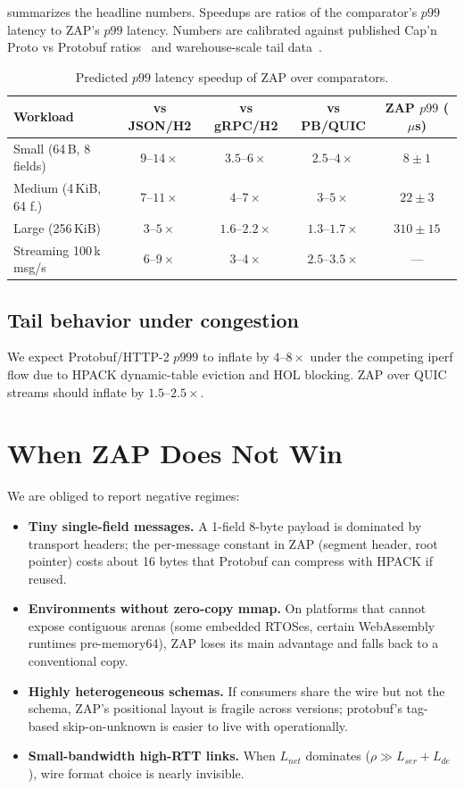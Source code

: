 \documentclass[11pt]{article}
\theoremstyle{definition}
\theoremstyle{remark}
\begin{document}
 summarizes the headline numbers. Speedups are
ratios of the comparator's $p99$ latency to ZAP's $p99$ latency.
Numbers are calibrated against published Cap'n Proto vs Protobuf
ratios~\cite{capnproto-bench} and warehouse-scale tail
data~\cite{xu2024microsecond}.

\begin{table}[h]
\centering
\caption{Predicted $p99$ latency speedup of ZAP over comparators.}
\label{tab:predicted}
\begin{tabular}{lcccc}
\toprule
Workload & vs JSON/H2 & vs gRPC/H2 & vs PB/QUIC & ZAP $p99$ ($\mu$s) \\
\midrule
Small (64\,B, 8 fields)  & $9$--$14\times$ & $3.5$--$6\times$ & $2.5$--$4\times$ & $8\pm1$ \\
Medium (4\,KiB, 64 f.)   & $7$--$11\times$ & $4$--$7\times$   & $3$--$5\times$   & $22\pm3$ \\
Large (256\,KiB)         & $3$--$5\times$  & $1.6$--$2.2\times$ & $1.3$--$1.7\times$ & $310\pm15$ \\
Streaming 100\,k msg/s   & $6$--$9\times$  & $3$--$4\times$   & $2.5$--$3.5\times$ & --- \\
\bottomrule
\end{tabular}
\end{table}

\subsection{Tail behavior under congestion}
We expect Protobuf/HTTP-2 $p999$ to inflate by $4$--$8\times$ under the
competing iperf flow due to HPACK dynamic-table eviction and
HOL blocking. ZAP over QUIC streams should inflate by $1.5$--$2.5\times$.

\section{When ZAP Does Not Win}
\label{sec:caveats}

We are obliged to report negative regimes:
\begin{itemize}
  \item \textbf{Tiny single-field messages.} A 1-field 8-byte payload
        is dominated by transport headers; the per-message constant in
        ZAP (segment header, root pointer) costs about 16 bytes that
        Protobuf can compress with HPACK if reused.
  \item \textbf{Environments without zero-copy mmap.} On platforms that
        cannot expose contiguous arenas (some embedded RTOSes, certain
        WebAssembly runtimes pre-memory64), ZAP loses its main
        advantage and falls back to a conventional copy.
  \item \textbf{Highly heterogeneous schemas.} If consumers share the
        wire but not the schema, ZAP's positional layout is fragile
        across versions; protobuf's tag-based skip-on-unknown is
        easier to live with operationally.
  \item \textbf{Small-bandwidth high-RTT links.} When $L_{\textit{net}}$
        dominates ($\rho \gg L_{\textit{ser}}+L_{\textit{de}}$), wire format choice
        is nearly invisible.
\end{itemize}
\end{document}
